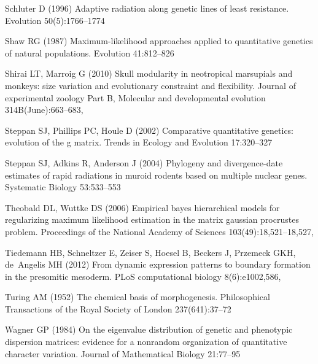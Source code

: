\documentclass [twocolumn, natbib, nospthms, 10pt] {svjour3}
\begin{document}
\begin{thebibliography}{77}
Schluter D (1996) Adaptive radiation along genetic lines of least resistance.
  Evolution 50(5):1766–1774

Shaw RG (1987) Maximum-likelihood approaches applied to quantitative genetics
  of natural populations. Evolution 41:812–826

Shirai LT, Marroig G (2010) Skull modularity in neotropical marsupials and
  monkeys: size variation and evolutionary constraint and flexibility. Journal
  of experimental zoology Part B, Molecular and developmental evolution
  314B(June):663–683, 

Steppan SJ, Phillips PC, Houle D (2002) Comparative quantitative genetics:
  evolution of the g matrix. Trends in Ecology and Evolution 17:320–327

Steppan SJ, Adkins R, Anderson J (2004) Phylogeny and divergence-date estimates
  of rapid radiations in muroid rodents based on multiple nuclear genes.
  Systematic Biology 53:533–553

Theobald DL, Wuttke DS (2006) Empirical bayes hierarchical models for
  regularizing maximum likelihood estimation in the matrix gaussian procrustes
  problem. Proceedings of the National Academy of Sciences
  103(49):18,521--18,527, 

Tiedemann HB, Schneltzer E, Zeiser S, Hoesel B, Beckers J, Przemeck GKH,
  de~Angelis MH (2012) From dynamic expression patterns to boundary formation
  in the presomitic mesoderm. {PLoS} computational biology 8(6):e1002,586,

Turing AM (1952) The chemical basis of morphogenesis. Philosophical
  Transactions of the Royal Society of London 237(641):37–72

Wagner GP (1984) On the eigenvalue distribution of genetic and phenotypic
  dispersion matrices: evidence for a nonrandom organization of quantitative
  character variation. Journal of Mathematical Biology 21:77–95


\end{thebibliography}
\end{document}
